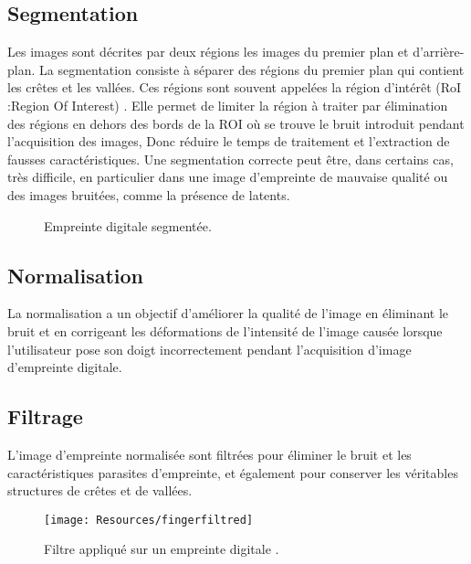 \subsection{Segmentation}
Les images sont décrites par deux régions les images du premier plan et d’arrière-plan. La segmentation consiste à séparer des régions du premier plan qui contient les crêtes et les vallées. Ces régions sont souvent appelées la région d'intérêt (RoI :Region Of Interest) \citep{Babatunde2012}. Elle permet de limiter la région à traiter par élimination des régions en dehors des bords de la ROI où se trouve le bruit introduit pendant l’acquisition des images, Donc réduire le temps de traitement et l'extraction de fausses caractéristiques. Une segmentation correcte peut être, dans certains cas, très difficile, en particulier dans une image d'empreinte  de mauvaise qualité ou des images bruitées, comme la présence de latents. 
\begin{center}
	\begin{figure}[H]
		\centering
		\caption{Empreinte digitale segmentée.}
		\label{fig:annexefingersegmented}
	\end{figure}
\end{center}
\subsection{Normalisation}
La normalisation a un objectif d’améliorer la qualité de l’image en éliminant le bruit et en corrigeant les déformations de l'intensité de l'image causée lorsque l’utilisateur pose son doigt incorrectement pendant l’acquisition d’image d’empreinte digitale.
\subsection{Filtrage}
L'image d'empreinte  normalisée sont filtrées pour éliminer le bruit et les caractéristiques parasites d’empreinte, et également pour conserver les véritables structures de crêtes et de vallées.
\begin{center}
	\begin{figure}[H]
		\centering
		\texttt{[image: Resources/fingerfiltred]}
		\caption{Filtre appliqué sur un empreinte digitale \citep{saveski2010development}.}
		\label{fig:annexefingerfiltred}
	\end{figure}
\end{center}
